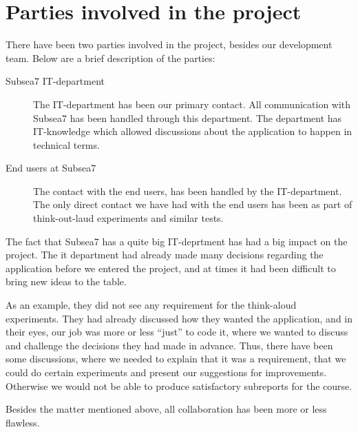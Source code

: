\section{Parties involved in the project} 
    There have been two parties involved in the project, besides our
    development team. Below are a brief description of the parties:

    \begin{description} \item [Subsea7 IT-department] The IT-department has
                been our primary contact. All communication with Subsea7 has
                been handled through this department. The department has
                IT-knowledge which allowed discussions about the application to
                happen in technical terms.   

        \item [End users at Subsea7] The contact with the end users, has been
    handled by the IT-department. The only direct contact we have had with the
    end users has been as part of think-out-laud experiments and similar tests.
    \end{description}

    The fact that Subsea7 has a quite big  IT-deprtment has had a big impact on
    the project. The it department had already made many decisions regarding
    the application before we entered the project, and at times it had been
    difficult to bring new ideas to the table. 

    As an example, they did not see any requirement for the think-aloud
    experiments. They had already discussed how they wanted the application,
    and in their eyes, our job was more or less ``just'' to code it, where we
    wanted to discuss and challenge the decisions they had made in advance.
    Thus, there have been some discussions, where we needed to explain that it
    was a requirement, that we could do certain  experiments and present our
    suggestions for improvements. Otherwise we would not be able to produce
    satisfactory subreports for the course.

    Besides the matter mentioned above, all collaboration has been more or less
    flawless.
